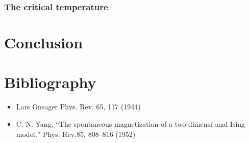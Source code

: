 \documentclass[a4paper, twoside, 11pt]{report}
\theoremstyle{theorem}
\theoremstyle{remark}
\theoremstyle{exemple}
\begin{document}
        \newpage
        \subsection{The critical temperature}



\chapter*{Conclusion}

    \paragraph{}
    

\chapter*{Bibliography}
    
    \begin{itemize}
        \item Lars Onsager Phys. Rev. 65, 117 (1944)
        \item C. N. Yang, “The spontaneous magnetization of a two-dimensi
onal Ising model,” Phys.  Rev.85, 808–816 (1952)
    \end{itemize}
    
\end{document}
